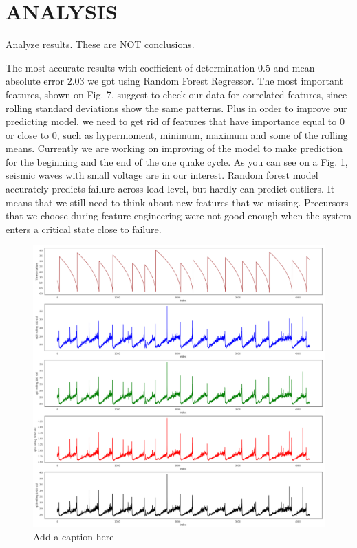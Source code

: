 \documentclass[]{llncs}
\begin{document}
\section{ANALYSIS}
Analyze results.
These are NOT conclusions.

The most accurate results with coefficient of determination 0.5 and mean absolute error 2.03 we got using Random Forest Regressor. The most important features, shown on Fig. 7, suggest to check our data for correlated features, since rolling standard deviations show the same patterns. Plus in order to improve our predicting model, we need to get rid of features that have importance equal to 0 or close to 0, such as hypermoment, minimum, maximum and some of the rolling means. Currently we are working on improving of the model to make prediction for the beginning and the end of the one quake cycle. As you can see on a Fig. 1, seismic waves with small voltage are in our interest. Random forest model accurately predicts failure across load level, but hardly can predict outliers. It means that we still need to think about new features that we missing. Precursors that we choose during feature engineering were not good enough when the system enters a critical state close to failure.
\begin{figure}
	\centering
	\includegraphics[width=1\linewidth]{../GPUProject/Analysis1.png}
	\caption{Add a caption here}
	\label{fig:morethan90percent}
\end{figure}
\end{document}

